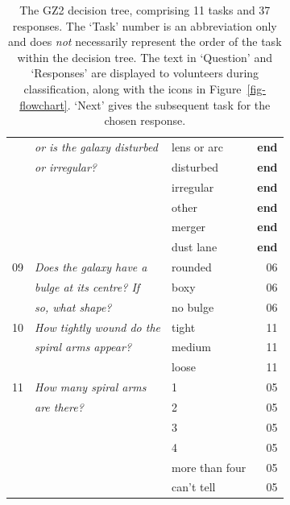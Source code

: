 \documentclass[useAMS,usenatbib]{mn2e}
\begin{document}
\begin{table}
\begin{tabular}{@{}cllr}
      & {\it or is the galaxy disturbed    }  & lens or arc      & {\bf end}        \\
      & {\it or irregular?                 }  & disturbed        & {\bf end}        \\
      & {\it                               }  & irregular        & {\bf end}        \\  
      & {\it                               }  & other            & {\bf end}        \\  
      & {\it                               }  & merger           & {\bf end}        \\  
      & {\it                               }  & dust lane        & {\bf end}        \\  
      \hline
09    & {\it Does the galaxy have a        }  & rounded          & 06 \\
      & {\it bulge at its centre? If       }  & boxy             & 06 \\
      & {\it so, what shape?               }  & no bulge         & 06 \\
      \hline
10    & {\it How tightly wound do the      }  & tight            & 11 \\
      & {\it spiral arms appear?           }  & medium           & 11 \\
      & {\it                               }  & loose            & 11 \\    
      \hline
11    & {\it How many spiral arms          }  & 1                & 05 \\
      & {\it  are there?                   }  & 2                & 05 \\
      & {\it                               }  & 3                & 05 \\
      & {\it                               }  & 4                & 05 \\
      & {\it                               }  & more than four   & 05 \\
      & {\it                               }  & can't tell       & 05 \\
\hline
 \end{tabular}
 \caption{The GZ2 decision tree, comprising 11 tasks and 37 responses. The `Task' number is an abbreviation only and does {\em not} necessarily represent the order of the task within the decision tree. The text in `Question' and `Responses' are displayed to volunteers during classification, along with the icons in Figure~\ref{fig-flowchart}. `Next' gives the subsequent task for the chosen response. \label{tbl-tree}}
\end{table}
\end{document}
